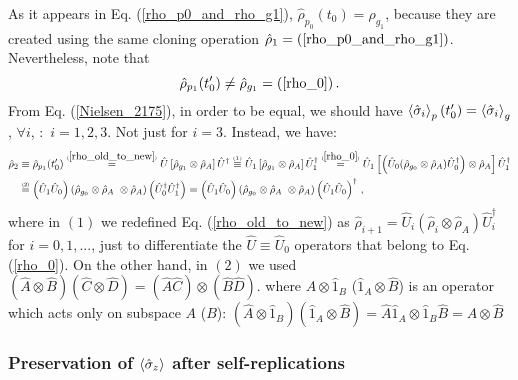\documentclass[11pt]{article}
\numberwithin{equation}{section} %
\numberwithin{figure}{section} %
\newcommand\numeq[1] %
  {\stackrel{\scriptscriptstyle(\mkern-1.5mu#1\mkern-1.5mu)}{=}}
\begin{document}
As it appears in Eq. (\ref{rho_p0_and_rho_g1}), $\hat{\rho}_{p_0}(t_0)=\hat{\rho}_{g_1}$, because they are created using the same cloning operation $\hat{\rho}_1 =(\ref{rho_p0_and_rho_g1})$. Nevertheless, note that
\begin{equation} \label{pheno_t0} 
\hat{\rho}_{p_1}(t_0^\prime)\neq\hat{\rho}_{g_1}=(\ref{rho_0})
\,\textrm{.}
\end{equation} 
From Eq. (\ref{Nielsen_2175}), in order to be equal, we should have $\braket{\hat{\sigma}_i}_p(t_0^\prime)=\braket{\hat{\sigma}_i}_g$, $\forall i$, $:$ $i=1,2,3$. Not just for $i=3$. Instead, we have: $\,$ \cite[p.~2, Eq.~(8)]{Bio_Cloning}
\begin{equation}
\begin{split}
\hat{\rho}_2
&\equiv \hat{\rho}_{p_1} (t_0^\prime)\numeq{\ref{rho_old_to_new}}\hat{U} \left[\hat{\rho}_{g_1}\otimes\hat{\rho}_A \right]\hat{U}^\dagger  \,\,\newcommand\myeq1{\mathrel{\stackrel{\makebox[0pt]{\mbox{\normalfont\tiny \textrm{(1)}}}}{\equiv}}}\,\,   \hat{U}_1 \left[\hat{\rho}_{g_1}\otimes\hat{\rho}_A \right]\hat{U}_1^\dagger \numeq{\ref{rho_0}}\hat{U}_1\left[\left(  \hat{U}_0 (\hat{\rho}_{g_0}\otimes\hat{\rho}_A)\hat{U}_0^\dagger\right)\otimes\hat{\rho}_A\right]\hat{U}_1^\dagger\\
& \numeq{2} \left(\hat{U}_1\hat{U}_0 \right)  \left(\hat{\rho}_{g_0}\otimes\hat{\rho}_A\ \otimes\hat{\rho}_A\right) \left(\hat{U}_0^\dagger\hat{U}_1^\dagger\right) = \left(\hat{U}_1\hat{U}_0 \right)  \left(\hat{\rho}_{g_0}\otimes\hat{\rho}_A\ \otimes\hat{\rho}_A\right) \left(\hat{U}_1\hat{U}_0\right)^\dagger  \,\textrm{,}
\end{split}
\end{equation}
where in $(1)$ we redefined Eq. (\ref{rho_old_to_new}) as $\hat{\rho}_{i+1}=\hat{U}_i (\hat{\rho}_i\otimes\hat{\rho}_A)\hat{U}_i^\dagger$ for $i=0,1,...$, just to differentiate the $\hat{U}\equiv \hat{U}_0$ operators that belong to Eq. (\ref{rho_0}). On the other hand, in $(2)$ we used $(\hat{A}\otimes\hat{B})(\hat{C}\otimes\hat{D})=(\hat{A}\hat{C})\otimes(\hat{B}\hat{D})$. where $\hat{A}\otimes\hat{1}_B$ ($\hat{1}_A\otimes\hat{B}$) is an operator which acts only on subspace $A$ ($B$): $(\hat{A}\otimes\hat{1}_B)(\hat{1}_A\otimes\hat{B})=\hat{A}\hat{1}_A\otimes \hat{1}_B\hat{B}=\hat{A}\otimes\hat{B}$ 



\subsubsection{Preservation of $\braket{\hat{\sigma}_z}$ after self-replications}  \label{preservation_sigma_z}
\end{document}
